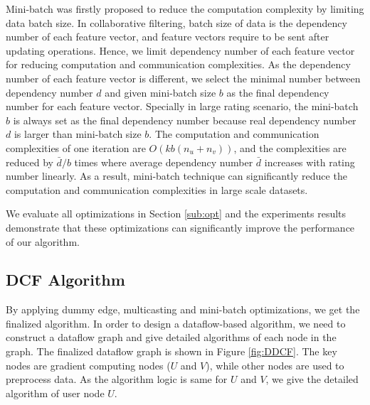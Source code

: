 \documentclass{llncs}
\begin{document}
Mini-batch \cite{Dean2012} was firstly proposed to reduce the computation complexity by limiting data batch size. In collaborative filtering, batch size of data is the dependency number of each feature vector, and feature vectors require to be sent after updating operations. Hence, we limit dependency number of each feature vector for reducing computation and communication complexities. As the dependency number of each feature vector is different, we select the minimal number between dependency number $d$ and given mini-batch size $b$ as the final dependency number for each feature vector. Specially in large rating scenario, the mini-batch $b$ is always set as the final dependency number because real dependency number $d$ is larger than mini-batch size $b$. The computation and communication complexities of one iteration are $O(kb(n_u + n_v))$, and the complexities are reduced by $\bar{d}/b$ times where average dependency number $\bar{d}$ increases with rating number linearly. As a result, mini-batch technique can significantly reduce the computation and communication complexities in large scale datasets.

We evaluate all optimizations in Section \ref{sub:opt} and the experiments results demonstrate that these optimizations can significantly improve the performance of our algorithm.

\vspace{-12pt}
\subsection{DCF Algorithm}
\vspace{-3pt}
By applying dummy edge, multicasting and mini-batch optimizations, we get the finalized algorithm. In order to design a dataflow-based algorithm, we need to construct a dataflow graph and give detailed algorithms of each node in the graph. The finalized dataflow graph is shown in Figure \ref{fig:DDCF}. The key nodes are gradient computing nodes ($U$ and $V$), while other nodes are used to preprocess data. As the algorithm logic is same for $U$ and $V$, we give the detailed algorithm of user node $U$.
\end{document}

